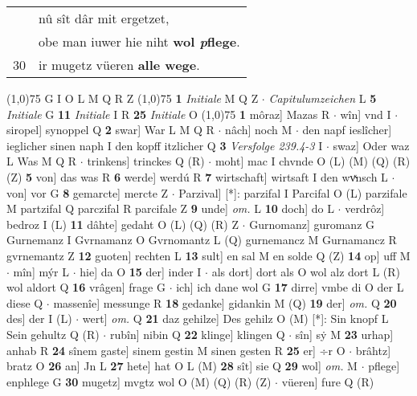 \documentclass[8pt,a4paper,notitlepage]{article}
\begin{document}
\begin{table}[ht]
\begin{minipage}[t]{0.5\linewidth}
\begin{tabular}{rl}
 & nû sît dâr mit ergetzet,\\ 
 & obe man iuwer hie niht \textbf{wol \textit{p}flege}.\\ 
30 & ir mugetz vüeren \textbf{alle wege}.\\ 
\end{tabular}
\scriptsize
\line(1,0){75} \newline
G I O L M Q R Z \newline
\line(1,0){75} \newline
\textbf{1} \textit{Initiale} M Q Z   $\cdot$ \textit{Capitulumzeichen} L  \textbf{5} \textit{Initiale} G  \textbf{11} \textit{Initiale} I R  \textbf{25} \textit{Initiale} O  \newline
\line(1,0){75} \newline
\textbf{1} môraz] Mazas R  $\cdot$ wîn] vnd I  $\cdot$ siropel] synoppel Q \textbf{2} swar] War L M Q R  $\cdot$ nâch] noch M  $\cdot$ den napf ieslîcher] ieglicher sinen naph I den kopff itzlicher Q \textbf{3} \textit{Versfolge 239.4-3} I   $\cdot$ swaz] Oder waz L Was M Q R  $\cdot$ trinkens] trinckes Q (R)  $\cdot$ moht] mac I chvnde O (L) (M) (Q) (R) (Z) \textbf{5} von] das was R \textbf{6} werde] werdú R \textbf{7} wirtschaft] wirtsaft I den wvͯnsch L  $\cdot$ von] vor G \textbf{8} gemarcte] mercte Z  $\cdot$ Parzival] [*]: parzifal I Parcifal O (L) parzifale M partzifal Q parczifal R parcifale Z \textbf{9} unde] \textit{om.} L \textbf{10} doch] do L  $\cdot$ verdrôz] bedroz I (L) \textbf{11} dâhte] gedaht O (L) (Q) (R) Z  $\cdot$ Gurnomanz] guromanz G Gurnemanz I Gvrnamanz O Gvrnomantz L (Q) gurnemancz M Gurnamancz R gvrnemantz Z \textbf{12} guoten] rechten L \textbf{13} sult] en sal M en solde Q (Z) \textbf{14} op] uff M  $\cdot$ mîn] mýr L  $\cdot$ hie] da O \textbf{15} der] inder I  $\cdot$ als dort] dort als O wol alz dort L (R) wol aldort Q \textbf{16} vrâgen] frage G  $\cdot$ ich] ich dane wol G \textbf{17} dirre] vmbe di O der L diese Q  $\cdot$ massenîe] messunge R \textbf{18} gedanke] gidankin M (Q) \textbf{19} der] \textit{om.} Q \textbf{20} des] der I (L)  $\cdot$ wert] \textit{om.} Q \textbf{21} daz gehilze] Des gehilz O (M) [*]: Sin knopf L Sein gehultz Q (R)  $\cdot$ rubîn] nibin Q \textbf{22} klinge] klingen Q  $\cdot$ sîn] sẏ M \textbf{23} urhap] anhab R \textbf{24} sînem gaste] sinem gestin M sinen gesten R \textbf{25} er] ÷r O  $\cdot$ brâhtz] bratz O \textbf{26} an] Jn L \textbf{27} hete] hat O L (M) \textbf{28} sît] sie Q \textbf{29} wol] \textit{om.} M  $\cdot$ pflege] enphlege G \textbf{30} mugetz] mvgtz wol O (M) (Q) (R) (Z)  $\cdot$ vüeren] fure Q (R) \newline

\end{minipage}
\end{table}
\end{document}
